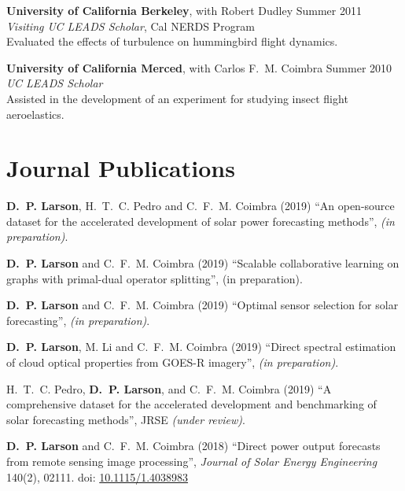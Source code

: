 \documentclass[10pt]{res}
\begin{document}
\begin{resume}
\textbf{University of California Berkeley}, with Robert Dudley \hfill Summer 2011 \\
\textit{Visiting UC LEADS Scholar}, Cal NERDS Program \\
Evaluated the effects of turbulence on hummingbird flight dynamics.

\textbf{University of California Merced}, with Carlos F.~M. Coimbra \hfill Summer 2010 \\
\textit{UC LEADS Scholar} \\
Assisted in the development of an experiment for studying insect flight aeroelastics.


\section{Journal Publications}
\vspace{0.1in}


\textbf{D.~P. Larson}, H.~T.~C. Pedro and C.~F.~M. Coimbra (2019) ``An open-source dataset for the accelerated development of solar power forecasting methods'', \textit{(in preparation)}.

\textbf{D.~P. Larson} and C.~F.~M. Coimbra (2019) ``Scalable collaborative learning on graphs with primal-dual operator splitting'', (in preparation).


\textbf{D.~P. Larson} and C.~F.~M. Coimbra (2019) ``Optimal sensor selection for solar forecasting'', \textit{(in preparation)}.

\textbf{D.~P. Larson}, M. Li and C.~F.~M. Coimbra (2019) ``Direct spectral estimation of cloud optical properties from GOES-R imagery'', \textit{(in preparation)}.

H.~T.~C. Pedro, \textbf{D.~P. Larson}, and C.~F.~M. Coimbra (2019) ``A comprehensive dataset for the accelerated development and benchmarking of solar forecasting methods'', JRSE \textit{(under review)}.

\textbf{D.~P. Larson} and C.~F.~M. Coimbra (2018) ``Direct power output forecasts from remote sensing image processing'', \textit{Journal of Solar Energy Engineering} 140(2), 02111. doi: \href{http://dx.doi.org/10.1115/1.4038983}{10.1115/1.4038983}


\end{resume}
\end{document}
